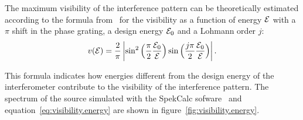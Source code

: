 The maximum visibility of the interference pattern can be theoretically
estimated according to the formula from~\cite{Thuering20130027} for the visibility as a function
of energy $\mathcal{E}$ with a $\pi$ shift in the phase grating, a design energy
$\mathcal{E}_0$ and a Lohmann order $j$:
\begin{equation}
            v(\mathcal{E}) = \frac{2}{\pi} \left\lvert \sin^2
            \Big(\frac{\pi}{2}\frac{\mathcal{E}_0}{\mathcal{E}}\Big) 
            \sin
            \Big(\frac{j\pi}{2}\frac{\mathcal{E}_0}{\mathcal{E}}\Big) 
            \right\rvert.
    \label{eq:visibility.energy}
\end{equation}

This formula indicates how energies different from the design energy of the
interferometer contribute to the visibility of the interference pattern. The
spectrum of the source simulated with the SpekCalc sofware~\cite{spekcalc}
and equation~\eqref{eq:visibility.energy} are shown in
figure~\ref{fig:visibility.energy}.

